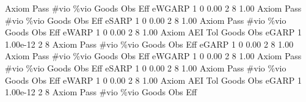 {\smallskip}
{\smallskip}
       Axiom {\VBAR} Pass        \#vio        \%vio       Goods         Obs         Eff  
      eWGARP {\VBAR}    1           0        0.00           2           8        1.00  
{\smallskip}
{\smallskip}
{\smallskip}
       Axiom {\VBAR} Pass        \#vio        \%vio       Goods         Obs         Eff  
       eSARP {\VBAR}    1           0        0.00           2           8        1.00  
{\smallskip}
{\smallskip}
{\smallskip}
       Axiom {\VBAR} Pass        \#vio        \%vio       Goods         Obs         Eff  
       eWARP {\VBAR}    1           0        0.00           2           8        1.00  
{\smallskip}
       Axiom {\VBAR}       AEI        Tol      Goods        Obs 
       eGARP {\VBAR}         1   1.00e-12          2          8 
{\smallskip}
{\smallskip}
{\smallskip}
       Axiom {\VBAR} Pass        \#vio        \%vio       Goods         Obs         Eff  
       eGARP {\VBAR}    1           0        0.00           2           8        1.00  
{\smallskip}
{\smallskip}
{\smallskip}
       Axiom {\VBAR} Pass        \#vio        \%vio       Goods         Obs         Eff  
      eWGARP {\VBAR}    1           0        0.00           2           8        1.00  
{\smallskip}
{\smallskip}
{\smallskip}
       Axiom {\VBAR} Pass        \#vio        \%vio       Goods         Obs         Eff  
       eSARP {\VBAR}    1           0        0.00           2           8        1.00  
{\smallskip}
{\smallskip}
{\smallskip}
       Axiom {\VBAR} Pass        \#vio        \%vio       Goods         Obs         Eff  
       eWARP {\VBAR}    1           0        0.00           2           8        1.00  
{\smallskip}
       Axiom {\VBAR}       AEI        Tol      Goods        Obs 
       eGARP {\VBAR}         1   1.00e-12          2          8 
{\smallskip}
{\smallskip}
{\smallskip}
       Axiom {\VBAR} Pass        \#vio        \%vio       Goods         Obs         Eff  
